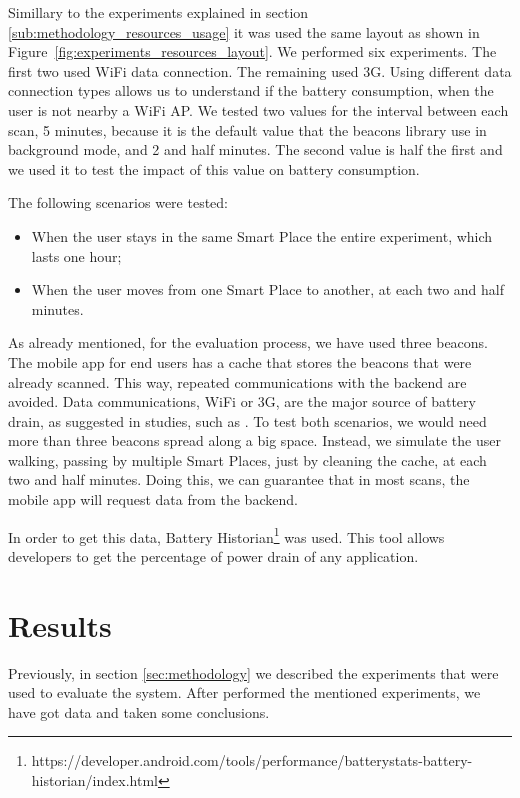Simillary to the experiments explained in section \ref{sub:methodology_resources_usage} it was used the same layout as shown in Figure~\ref{fig:experiments_resources_layout}. We performed six experiments. The first two used \gls{WiFi} data connection. The remaining used \gls{3G}.
Using different data connection types allows us to understand if the battery consumption, when the user is not nearby a \gls{WiFi} \gls{AP}.
We tested two values for the interval between each scan, 5 minutes, because it is the default value that the beacons library use in background mode, and 2 and half minutes.
The second value is half the first and we used it to test the impact of this value on battery consumption.

The following scenarios were tested:
\begin{itemize}
  \item When the user stays in the same Smart Place the entire experiment, which lasts one hour;
  \item When the user moves from one Smart Place to another, at each two and half minutes.
\end{itemize}

As already mentioned, for the evaluation process, we have used three  beacons.
The mobile app for end users has a cache that stores the beacons that were already scanned.
This way, repeated communications with the backend are avoided.
Data communications, \gls{WiFi} or \gls{3G}, are the major source of battery drain, as suggested in studies, such as \cite{energy}.
To test both scenarios, we would need more than three beacons spread along a big space.
Instead, we simulate the user walking, passing by multiple Smart Places, just by cleaning the cache,
at each two and half minutes.
Doing this, we can guarantee that in most scans, the mobile app will request data from the backend.

In order to get this data, Battery Historian\footnote{https://developer.android.com/tools/performance/batterystats-battery-historian/index.html} was used. This tool allows developers to get the percentage of power drain of any application.

\section{Results}
\label{sec:results}
Previously, in section \ref{sec:methodology} we described the experiments that were used to evaluate the system.
After performed the mentioned experiments, we have got data and taken some conclusions.

